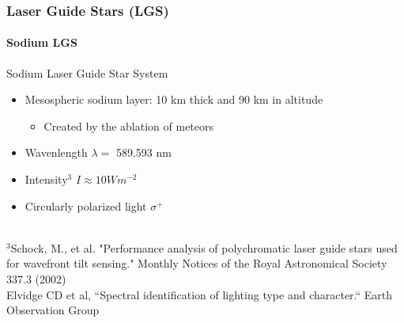 \documentclass{beamer}
\newcommand{\btVFill}{\vskip0pt plus 1filll}
\begin{document}
\begin{frame}
  \frametitle{Laser Guide Stars (LGS)}
  \framesubtitle{Sodium LGS}
  Sodium Laser Guide Star System\\
  \begin{itemize}
	\item Mesospheric sodium layer: 10 km thick and 90 km in altitude\\
	  \begin{itemize}
		\item Created by the ablation of meteors
	  \end{itemize}
  \end{itemize}
  \begin{minipage}{.45\textwidth}
  \begin{itemize}
	\item Wavenlength $\lambda=$ 589.593 nm\\
	\item Intensity$^3$ $I \approx 10 Wm^{-2}$
	\item Circularly polarized light $\sigma ^+$
  \end{itemize}
\end{minipage}
\begin{minipage}{.35\textwidth}
\end{minipage}
	 \\{\tiny $^3$Schock, M., et al. "Performance analysis of polychromatic laser guide stars used for wavefront tilt sensing." Monthly Notices of the Royal Astronomical Society 337.3 (2002)}\\
 
	  {\tiny Elvidge CD et al, ``Spectral identification of lighting type and character.`` Earth Observation Group}\\
\end{frame}
\end{document}
